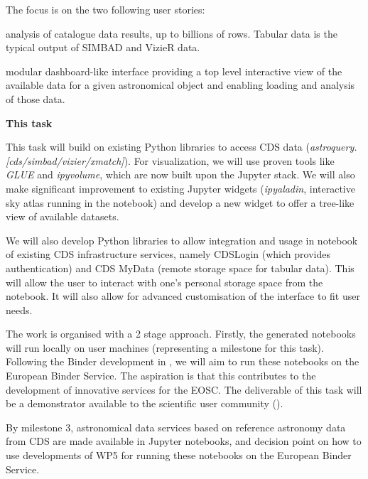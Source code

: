 \begin{task}[
  title=Astronomy application,
  id=astro,
  lead=CDS,
  PM=18,
  wphases={18-42},
  partners={QS,WTT,SRL,INSERM,XFEL}
]
  The focus is on the two following user stories:
    \begin{compactitem}
        \item analysis of catalogue data results, up to billions of rows.
              Tabular data is the typical output of SIMBAD and VizieR data.
        \item modular dashboard-like interface providing a top level
              interactive view of the available data for a given astronomical
              object and enabling loading and analysis of those data.
    \end{compactitem}


  \textbf{This task}

  This task will build on existing Python libraries to access CDS data
  (\textit{astroquery.[cds/simbad/vizier/xmatch]}). For visualization, we will
  use proven tools like \textit{GLUE} and \textit{ipyvolume}, which are now
  built upon the Jupyter stack.
  We will also make significant improvement to existing Jupyter widgets
  (\textit{ipyaladin}, interactive sky atlas running in the notebook) and
  develop a new widget to offer a tree-like view of available datasets.

  We will also develop Python libraries to allow integration and usage in
  notebook of existing CDS infrastructure services, namely CDSLogin (which
  provides authentication) and CDS MyData (remote storage space for tabular
  data).
  This will allow the user to interact with one's personal storage space from
  the notebook. It will also allow for advanced customisation of the interface 
  to fit user needs.

  The work is organised with a 2 stage approach. Firstly, the generated 
  notebooks will run locally on user machines (representing a milestone for 
  this task). Following the Binder development in , we will aim 
  to run these notebooks on the European Binder Service. The aspiration is 
  that this contributes to the development of innovative services for the EOSC.
  The deliverable of this task will be a demonstrator available to the 
  scientific user community ().

  By milestone 3, astronomical data services based on reference astronomy data from CDS are made available in Jupyter notebooks, and decision point on how to use developments of WP5 for running these notebooks on the European Binder Service.


\end{task}
